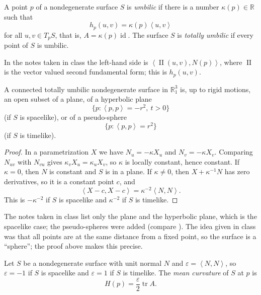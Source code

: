 \begin{definition}
\label{definition-palmas-umbilic}
A point $p$ of a nondegenerate surface $S$
is \emph{umbilic} if there is a number
$\kappa(p)\in\mathbb{R}$ such that
$$
h_p(u,v)=\kappa(p)
\left\langle{} u,v \right\rangle{}
$$
for all $u,v\in T_pS$, that is,
$A=\kappa(p)\operatorname{id}$. The surface
$S$ is \emph{totally umbilic} if every
point of $S$ is umbilic.
\end{definition}

In the notes taken in class the left-hand
side is
$\left\langle{} \operatorname{II}(u,v),N(p)
\right\rangle{}$, where
$\operatorname{II}$ is the vector valued
second fundamental form; this is
$h_p(u,v)$.

\begin{proposition}
\label{proposition-palmas-totally-umbilic}
A connected totally umbilic nondegenerate
surface in $\mathbb{R}^3_1$ is, up to rigid
motions, an open subset of a plane, of a
hyperbolic plane
$$
\{p : \left\langle{} p,p
\right\rangle{}=-r^2,\ t>0\}
$$
(if $S$ is spacelike), or of a
pseudo-sphere
$$
\{p : \left\langle{} p,p
\right\rangle{}=r^2\}
$$
(if $S$ is timelike).
\end{proposition}

\begin{proof}
In a parametrization $X$ we have
$N_u=-\kappa X_u$ and $N_v=-\kappa X_v$.
Comparing $N_{uv}$ with $N_{vu}$ gives
$\kappa_vX_u=\kappa_uX_v$, so $\kappa$ is
locally constant, hence constant. If
$\kappa=0$, then $N$ is constant and $S$ is
in a plane. If $\kappa\neq 0$, then
$X+\kappa^{-1}N$ has zero derivatives, so
it is a constant point $c$, and
$$
\left\langle{} X-c,X-c \right\rangle{}
=\kappa^{-2}\left\langle{} N,N
\right\rangle{}.
$$
This is $-\kappa^{-2}$ if $S$ is spacelike
and $\kappa^{-2}$ if $S$ is timelike.
\end{proof}

The notes taken in class list only the
plane and the hyperbolic plane, which is
the spacelike case; the pseudo-spheres were
added (compare \cite[Theorem
3.2]{lopez2014differential}). The idea
given in class was that all points are at
the same distance from a fixed point, so
the surface is a ``sphere''; the proof above
makes this precise.

\begin{definition}
\label{definition-palmas-mean-curvature}
Let $S$ be a nondegenerate surface with
unit normal $N$ and
$\varepsilon=\left\langle{} N,N
\right\rangle{}$, so $\varepsilon=-1$ if
$S$ is spacelike and $\varepsilon=1$ if
$S$ is timelike. The \emph{mean curvature}
of $S$ at $p$ is
$$
H(p)=\frac{\varepsilon}{2}
\operatorname{tr}A.
$$
\end{definition}

